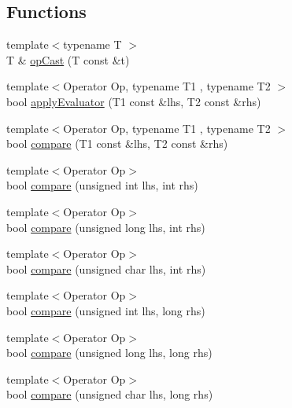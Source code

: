 \subsection*{Functions}
\begin{DoxyCompactItemize}
\item 
{\footnotesize template$<$typename T $>$ }\\T \& \mbox{\hyperlink{namespace_catch_1_1_internal_adde98c1a650e94615e2b37ab0b3734e2}{op\+Cast}} (T const \&t)
\item 
{\footnotesize template$<$Operator Op, typename T1 , typename T2 $>$ }\\bool \mbox{\hyperlink{namespace_catch_1_1_internal_a3849d993997f2b708281ff02e77dfecf}{apply\+Evaluator}} (T1 const \&lhs, T2 const \&rhs)
\item 
{\footnotesize template$<$Operator Op, typename T1 , typename T2 $>$ }\\bool \mbox{\hyperlink{namespace_catch_1_1_internal_a64ae04769c4583b9d4027c792b496c7d}{compare}} (T1 const \&lhs, T2 const \&rhs)
\item 
{\footnotesize template$<$Operator Op$>$ }\\bool \mbox{\hyperlink{namespace_catch_1_1_internal_a171aec1826898b877980a2b15fe5f735}{compare}} (unsigned int lhs, int rhs)
\item 
{\footnotesize template$<$Operator Op$>$ }\\bool \mbox{\hyperlink{namespace_catch_1_1_internal_aa2698c33ec87b16aff5c844165483a7a}{compare}} (unsigned long lhs, int rhs)
\item 
{\footnotesize template$<$Operator Op$>$ }\\bool \mbox{\hyperlink{namespace_catch_1_1_internal_ad68724393ee3d7629001a2997f6134cc}{compare}} (unsigned char lhs, int rhs)
\item 
{\footnotesize template$<$Operator Op$>$ }\\bool \mbox{\hyperlink{namespace_catch_1_1_internal_ac2af7b6757f9bb3539bb78acff5c4649}{compare}} (unsigned int lhs, long rhs)
\item 
{\footnotesize template$<$Operator Op$>$ }\\bool \mbox{\hyperlink{namespace_catch_1_1_internal_ace20062a489a8a7049fe224d62e644a7}{compare}} (unsigned long lhs, long rhs)
\item 
{\footnotesize template$<$Operator Op$>$ }\\bool \mbox{\hyperlink{namespace_catch_1_1_internal_a640e0cce9260a912842bee58db501dc5}{compare}} (unsigned char lhs, long rhs)

\end{DoxyCompactItemize}
